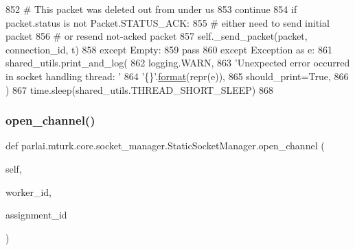\begin{DoxyCode}
852                                 \textcolor{comment}{# This packet was deleted out from under us}
853                                 \textcolor{keywordflow}{continue}
854                             \textcolor{keywordflow}{if} packet.status \textcolor{keywordflow}{is} \textcolor{keywordflow}{not} Packet.STATUS\_ACK:
855                                 \textcolor{comment}{# either need to send initial packet}
856                                 \textcolor{comment}{# or resend not-acked packet}
857                                 self.\_send\_packet(packet, connection\_id, t)
858                     \textcolor{keywordflow}{except} Empty:
859                         \textcolor{keywordflow}{pass}
860                 \textcolor{keywordflow}{except} Exception \textcolor{keyword}{as} e:
861                     shared\_utils.print\_and\_log(
862                         logging.WARN,
863                         \textcolor{stringliteral}{'Unexpected error occurred in socket handling thread: '}
864                         \textcolor{stringliteral}{'\{\}'}.\hyperlink{namespaceparlai_1_1chat__service_1_1services_1_1messenger_1_1shared__utils_a32e2e2022b824fbaf80c747160b52a76}{format}(repr(e)),
865                         should\_print=\textcolor{keyword}{True},
866                     )
867             time.sleep(shared\_utils.THREAD\_SHORT\_SLEEP)
868 
\end{DoxyCode}
\mbox{\label{classparlai_1_1mturk_1_1core_1_1socket__manager_1_1StaticSocketManager_a4672bc8a07f4ae122338ceb3a59cd54a}} 
\subsubsection{\texorpdfstring{open\+\_\+channel()}{open\_channel()}}
{\footnotesize\ttfamily def parlai.\+mturk.\+core.\+socket\+\_\+manager.\+Static\+Socket\+Manager.\+open\+\_\+channel (\begin{DoxyParamCaption}\item[{}]{self,  }\item[{}]{worker\+\_\+id,  }\item[{}]{assignment\+\_\+id }\end{DoxyParamCaption})}

